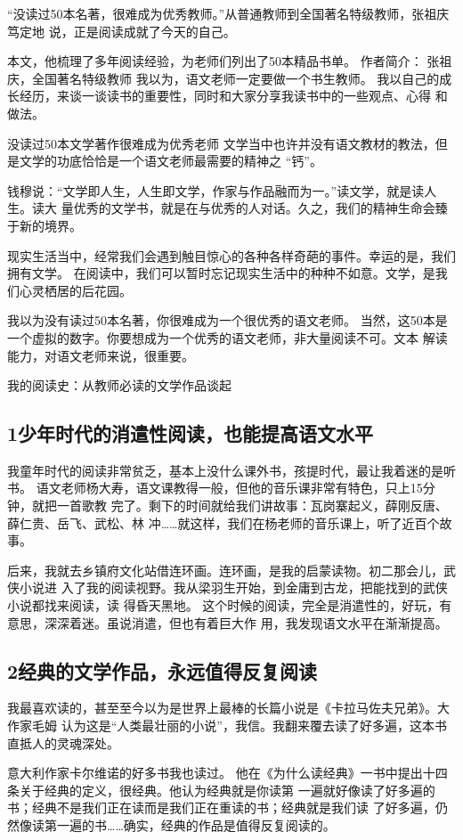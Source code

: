 \documentclass[11pt]{ctexart}
\begin{document}
{{{{“没读过50本名著，很难成为优秀教师。”从普通教师到全国著名特级教师，张祖庆笃定地
说，正是阅读成就了今天的自己。

本文，他梳理了多年阅读经验，为老师们列出了50本精品书单。
作者简介：
张祖庆，全国著名特级教师
我以为，语文老师一定要做一个书生教师。
我以自己的成长经历，来谈一谈读书的重要性，同时和大家分享我读书中的一些观点、心得
和做法。

没读过50本文学著作很难成为优秀老师
文学当中也许并没有语文教材的教法，但是文学的功底恰恰是一个语文老师最需要的精神之
“钙”。

钱穆说：“文学即人生，人生即文学，作家与作品融而为一。”读文学，就是读人生。读大
量优秀的文学书，就是在与优秀的人对话。久之，我们的精神生命会臻于新的境界。

现实生活当中，经常我们会遇到触目惊心的各种各样奇葩的事件。幸运的是，我们拥有文学。
在阅读中，我们可以暂时忘记现实生活中的种种不如意。文学，是我们心灵栖居的后花园。

我以为没有读过50本名著，你很难成为一个很优秀的语文老师。
当然，这50本是一个虚拟的数字。你要想成为一个优秀的语文老师，非大量阅读不可。文本
解读能力，对语文老师来说，很重要。

我的阅读史：从教师必读的文学作品谈起
\subsection{1少年时代的消遣性阅读，也能提高语文水平}
\label{sec:orgbbfd86a}
我童年时代的阅读非常贫乏，基本上没什么课外书，孩提时代，最让我着迷的是听书。
语文老师杨大寿，语文课教得一般，但他的音乐课非常有特色，只上15分钟，就把一首歌教
完了。剩下的时间就给我们讲故事：瓦岗寨起义，薛刚反唐、薛仁贵、岳飞、武松、林
冲……就这样，我们在杨老师的音乐课上，听了近百个故事。

后来，我就去乡镇府文化站借连环画。连环画，是我的启蒙读物。初二那会儿，武侠小说进
入了我的阅读视野。我从梁羽生开始，到金庸到古龙，把能找到的武侠小说都找来阅读，读
得昏天黑地。
这个时候的阅读，完全是消遣性的，好玩，有意思，深深着迷。虽说消遣，但也有着巨大作
用，我发现语文水平在渐渐提高。

\subsection{2经典的文学作品，永远值得反复阅读}
\label{sec:orgce67fa2}
我最喜欢读的，甚至至今以为是世界上最棒的长篇小说是《卡拉马佐夫兄弟》。大作家毛姆
认为这是“人类最壮丽的小说”，我信。我翻来覆去读了好多遍，这本书直抵人的灵魂深处。

意大利作家卡尔维诺的好多书我也读过。
他在《为什么读经典》一书中提出十四条关于经典的定义，很经典。他认为经典就是你读第
一遍就好像读了好多遍的书；经典不是我们正在读而是我们正在重读的书；经典就是我们读
了好多遍，仍然像读第一遍的书……确实，经典的作品是值得反复阅读的。

}}}}
\end{document}
